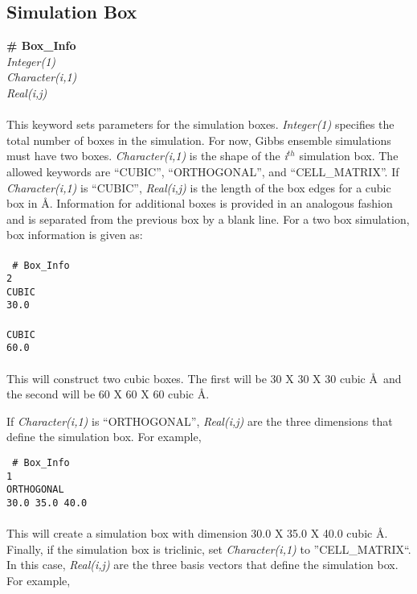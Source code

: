 \subsection{Simulation Box}\label{sec:Box_Info}
{\bf \# Box\_Info} \\
{\it Integer(1)} \\
{\it Character(i,1)}  \\
{\it Real(i,j)} \\ \\
This keyword sets parameters for the simulation boxes. 
{\it   Integer(1)} specifies the total number of boxes in the
simulation. For now, Gibbs ensemble simulations must have two boxes. 
{\it Character(i,1)} is the shape of the {\it i$^{th}$} simulation
box. The allowed keywords are ``CUBIC'', ``ORTHOGONAL'', and ``CELL\_MATRIX''.
%
If {\it Character(i,1)} is ``CUBIC'', \emph{Real(i,j)} is the length 
of the box edges for a cubic box in \AA. 
Information for additional boxes is provided in an analogous fashion
and is separated from the previous box by a blank line. For a two box
simulation, box information is given as: \\ \\ 
%
\texttt{
\# Box\_Info \\
 2 \\
 CUBIC \\
 30.0  \\
 \\
 CUBIC \\
 60.0}
\\ \\
This will construct two cubic boxes. The first will be 30 X 30 X 30
cubic \AA\ and the second will be 60 X 60 X 60 cubic \AA.

If {\it Character(i,1)} is ``ORTHOGONAL'', \emph{Real(i,j)} are the three
dimensions that define the simulation box. For example, 

\texttt{
\# Box\_Info \\
 1 \\
 ORTHOGONAL \\
 30.0 35.0 40.0}
\\ \\

This will create a simulation box with dimension 30.0 X 35.0 X 40.0 cubic \AA. \\

Finally, if the simulation box is triclinic, set {\it Character(i,1)} to
''CELL\_MATRIX``. In this case, \emph{Real(i,j)} are
the three basis vectors that define the simulation box. For example, 

